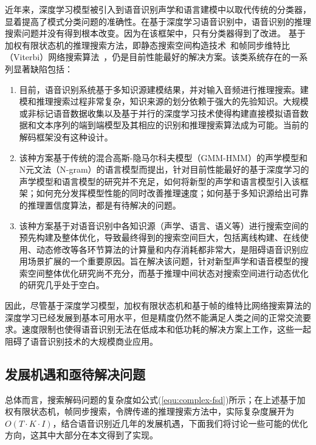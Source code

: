 近年来，深度学习模型被引入到语音识别声学和语言建模中以取代传统的分类器，显着提高了模式分类问题的准确性。在基于深度学习语音识别中，语音识别的推理搜索问题并没有得到根本改变。因为在该框架中，只有分类器得到了改进。
基于加权有限状态机的推理搜索方法，即静态搜索空间构造技术~\cite{mohri2002weighted}和帧同步维特比（Viterbi）网络搜索算法~\cite{forney1973viterbi}，仍是目前性能最好的解决方案。该类系统存在的一系列显著缺陷包括：
\begin{enumerate}
\item 目前，语音识别系统基于多知识源建模结果，并对输入音频进行推理搜索。建模和推理搜索过程非常复杂，知识来源的划分依赖于强大的先验知识。大规模或非标记语音数据收集以及基于并行的深度学习技术使得构建直接模拟语音数据和文本序列的端到端模型及其相应的识别和推理搜索算法成为可能。当前的解码框架没有这种设计。
\item 
该种方案基于传统的混合高斯-隐马尔科夫模型（GMM-HMM）的声学模型和N元文法（N-gram）的语言模型而提出，针对目前性能最好的基于深度学习的声学模型和语言模型的研究并不充足，如何将新型的声学和语言模型引入该框架；如何充分发挥模型性能的同时改善推理速度；如何基于多知识源给出可靠的推理置信度算法，都是有待解决的问题。
\item 
该种方案基于对语音识别中各知识源（声学、语言、语义等）进行搜索空间的预先构建及整体优化，导致最终得到的搜索空间巨大，包括离线构建、在线使用、动态修改等各环节算法的计算量和内存消耗都非常大，是阻碍语音识别应用场景扩展的一个重要原因。旨在解决该问题，针对新型声学和语音模型的搜索空间整体优化研究尚不充分，而基于推理中间状态对搜索空间进行动态优化的研究几乎处于空白。
\end{enumerate}
因此，尽管基于深度学习模型，加权有限状态机和基于帧的维特比网络搜索算法的深度学习已经发展到基本可用水平，但是精度仍然不能满足人类之间的正常交流要求。速度限制也使得语音识别无法在低成本和低功耗的解决方案上工作，这些一起阻碍了语音识别技术的大规模商业应用。

\subsection{发展机遇和亟待解决问题}
\label{chap:intro2-dec-todo}

总体而言，搜索解码问题的复杂度如公式(\ref{equ:complex-fsd})所示；在上述基于加权有限状态机，帧同步搜索，令牌传递的推理搜索方法中，实际复杂度展开为$O(T\cdot K \cdot I)$，结合语音识别近几年的发展机遇，下面我们将讨论一些可能的优化方向，这其中大部分在本文得到了实现。

